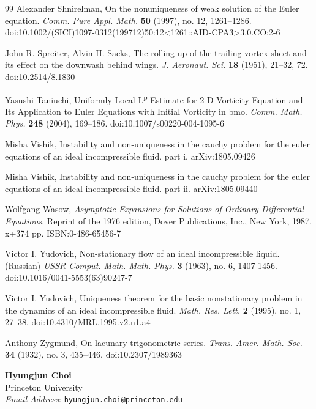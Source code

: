 \documentclass[11pt]{article}
\theoremstyle{definition}
\theoremstyle{remark}
\numberwithin{equation}{section}
\newcommand{\tbf}{\textbf}
\newcommand{\tsup}{\textsuperscript}
\begin{document}
\begin{flushleft}
\begin{thebibliography}{99}
 Alexander Shnirelman, On the nonuniqueness of weak solution of the Euler equation. \textit{Comm. Pure Appl. Math.} \tbf{50} (1997), no. 12, 1261–1286. doi:10.1002/(SICI)1097-0312(199712)50:12<1261::AID-CPA3>3.0.CO;2-6

 John R. Spreiter, Alvin H. Sacks, The rolling up of the trailing vortex sheet and its effect on the downwash behind wings. \textit{J. Aeronaut. Sci.} \tbf{18} (1951), 21–32, 72. doi:10.2514/8.1830

 Yasushi Taniuchi, Uniformly Local L\tsup{p} Estimate for 2-D Vorticity Equation and Its Application to Euler Equations with Initial Vorticity in bmo. \textit{Comm. Math. Phys.} \tbf{248} (2004), 169–186. doi:10.1007/s00220-004-1095-6

 Misha Vishik, Instability and non-uniqueness in the cauchy problem for the euler equations of an ideal incompressible fluid. part i. arXiv:1805.09426

 Misha Vishik, Instability and non-uniqueness in the cauchy problem for the euler equations of an ideal incompressible fluid. part ii. arXiv:1805.09440

 Wolfgang Wasow, \textit{Asymptotic Expansions for Solutions of Ordinary Differential Equations}. Reprint of the 1976 edition, Dover Publications, Inc., New York, 1987. x+374 pp. ISBN:0-486-65456-7

 Victor I. Yudovich, Non-stationary flow of an ideal incompressible liquid. (Russian) \textit{USSR Comput. Math. Math. Phys.} \tbf{3} (1963), no. 6, 1407-1456. doi:10.1016/0041-5553(63)90247-7

 Victor I. Yudovich, Uniqueness theorem for the basic nonstationary problem in the dynamics of an ideal incompressible fluid. \textit{Math. Res. Lett.} \tbf{2} (1995), no. 1, 27–38. doi:10.4310/MRL.1995.v2.n1.a4

 Anthony Zygmund, On lacunary trigonometric series. \textit{Trans. Amer. Math. Soc.} \tbf{34} (1932), no. 3, 435–446. doi:10.2307/1989363

\end{thebibliography} \end{flushleft}

\begingroup
\small
\setlength{\parskip}{0.45em}
\noindent
\textbf{Hyungjun Choi}\\
Princeton University\\
\textit{Email Address}: \href{mailto:hyungjun.choi@princeton.edu}{\texttt{hyungjun.choi@princeton.edu}}
\endgroup
\end{document}

